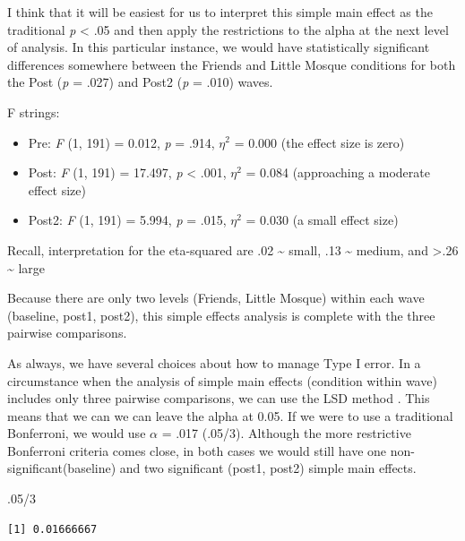 \documentclass[
  11pt,
]{book}
\newenvironment{Shaded}{\begin{snugshade}}{\end{snugshade}}
\newcommand{\DecValTok}[1]{\textcolor[rgb]{0.00,0.00,0.81}{#1}}
\newcommand{\NormalTok}[1]{#1}
\newcommand{\SpecialCharTok}[1]{\textcolor[rgb]{0.00,0.00,0.00}{#1}}
\providecommand{\tightlist}{%
  \setlength{\itemsep}{0pt}\setlength{\parskip}{0pt}}
\begin{document}
I think that it will be easiest for us to interpret this simple main effect as the traditional \emph{p} \textless{} .05 and then apply the restrictions to the alpha at the next level of analysis. In this particular instance, we would have statistically significant differences somewhere between the Friends and Little Mosque conditions for both the Post (\emph{p} = .027) and Post2 (\emph{p} = .010) waves.

F strings:

\begin{itemize}
\tightlist
\item
  Pre: \emph{F} (1, 191) = 0.012, \emph{p} = .914, \(\eta^{2}\) = 0.000 (the effect size is zero)
\item
  Post: \emph{F} (1, 191) = 17.497, \emph{p} \textless{} .001, \(\eta^{2}\) = 0.084 (approaching a moderate effect size)
\item
  Post2: \emph{F} (1, 191) = 5.994, \emph{p} = .015, \(\eta^{2}\) = 0.030 (a small effect size)
\end{itemize}

Recall, interpretation for the eta-squared are .02 \textasciitilde{} small, .13 \textasciitilde{} medium, and \textgreater.26 \textasciitilde{} large

Because there are only two levels (Friends, Little Mosque) within each wave (baseline, post1, post2), this simple effects analysis is complete with the three pairwise comparisons.

As always, we have several choices about how to manage Type I error. In a circumstance when the analysis of simple main effects (condition within wave) includes only three pairwise comparisons, we can use the LSD method \citep{green_using_2014}. This means that we can we can leave the alpha at 0.05. If we were to use a traditional Bonferroni, we would use \(\alpha\) = .017 (.05/3). Although the more restrictive Bonferroni criteria comes close, in both cases we would still have one non-significant(baseline) and two significant (post1, post2) simple main effects.

\begin{Shaded}
\begin{Highlighting}[]
\NormalTok{.}\DecValTok{05}\SpecialCharTok{/}\DecValTok{3}
\end{Highlighting}
\end{Shaded}

\begin{verbatim}
[1] 0.01666667
\end{verbatim}
\end{document}
